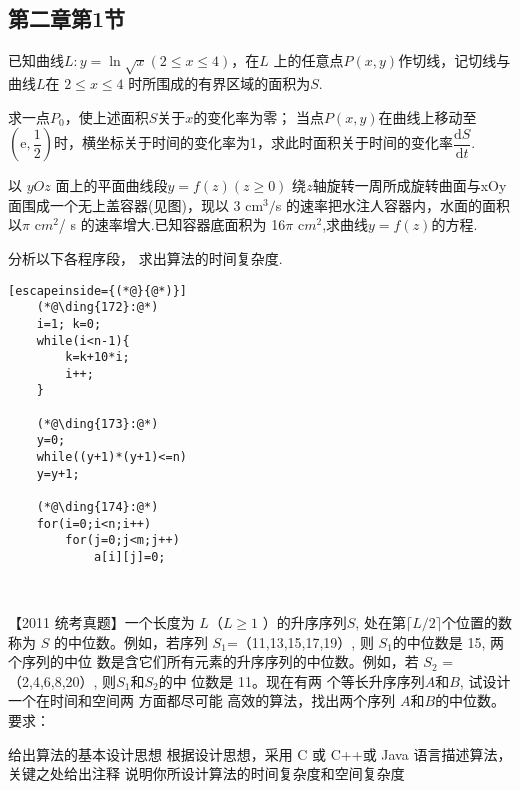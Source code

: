 \subsection{第二章第1节}
\begin{questions}[tr]
    
    \begin{bbox}
        \question  已知曲线$L:y=\ln\sqrt{x}(2\leqslant x\leqslant4)$，在$L$ 上的任意点$P(x,y)$作切线，记切线与曲线$L$在 $2\leqslant x\leqslant4$
        时所围成的有界区域的面积为$S$.
        \begin{subquestions}
            \subquestion 求一点$P_0$，使上述面积$S$关于$x$的变化率为零；
            \subquestion 当点$P(x,y)$在曲线上移动至$(\mathrm{e},\dfrac{1}{2})$时，横坐标关于时间的变化率为1，求此时面积关于时间的变化率$\dfrac{\mathrm{d}S}{\mathrm{d}t}.$
        \end{subquestions}

    \end{bbox}

    \begin{bbox}
        \question 以 $yOz$ 面上的平面曲线段$y=f(z)(z\geqslant0)$ 绕$z$轴旋转一周所成旋转曲面与xOy 面围成一个无上盖容器(见图)，现以 3 cm$^3/$s 的速率把水注人容器内，水面的面积以$\pi$ c$m^2$/ s 的速率增大.已知容器底面积为 16$\pi$ c$m^2$,求曲线$y=f(z)$的方程.

    \end{bbox}

    \begin{bbox}
        \question   分析以下各程序段， 求出算法的时间复杂度.
        \begin{lstlisting}[escapeinside={(*@}{@*)}]
    (*@\ding{172}:@*)
    i=1; k=0;
    while(i<n-1){
        k=k+10*i;
        i++;
    }

    (*@\ding{173}:@*)
    y=0;
    while((y+1)*(y+1)<=n)
    y=y+1;

    (*@\ding{174}:@*)
    for(i=0;i<n;i++)
        for(j=0;j<m;j++)
            a[i][j]=0;
    
        
        \end{lstlisting}
    \end{bbox}

    \begin{bbox}
        \question   【2011 统考真题】一个长度为 $L$（$L\geqslant 1$ ）的升序序列$ S$, 处在第$\lceil L/2\rceil $个位置的数称为 $S$
        的中位数。例如，若序列 $S_1$=（11,13,15,17,19）, 则 $S_1$的中位数是 15, 两 个序列的中位
        数是含它们所有元素的升序序列的中位数。例如，若 $S_2$ =（2,4,6,8,20）, 则$S_1$和$S_2$的中
        位数是 11。现在有两 个等长升序序列$A$和$B$, 试设计一个在时间和空间两 方面都尽可能
        高效的算法，找出两个序列 $A$和$B$的中位数。要求：
        \begin{subquestions}
            \subquestion 给出算法的基本设计思想
            \subquestion  根据设计思想，采用 C 或 C++或 Java 语言描述算法，关键之处给出注释
            \subquestion 说明你所设计算法的时间复杂度和空间复杂度
        \end{subquestions}
    \end{bbox}
\end{questions}